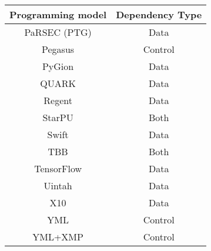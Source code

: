 \begin{tabular}{cc}
\hline
Programming model & Dependency Type \\
\hline
PaRSEC (PTG) & Data\\
Pegasus & Control\\
PyGion & Data\\
QUARK & Data\\
Regent & Data\\
StarPU & Both\\
Swift & Data\\
TBB & Both\\
TensorFlow & Data\\
Uintah & Data\\
X10 & Data\\
YML & Control\\
YML+XMP & Control\\
\hline
\end{tabular}
